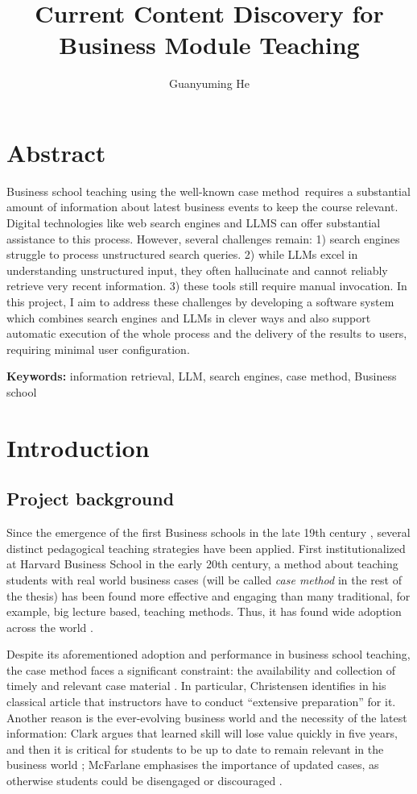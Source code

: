 \documentclass[final-report]{report-template}
\title{Current Content Discovery for Business Module Teaching}
\author{Guanyuming He}
\newcommand\casemethod{case method}
\begin{document}
\maketitlepage  

\section*{Abstract}
Business school teaching using the well-known \casemethod\ requires a
substantial amount of information about latest business events to keep the
course relevant.  Digital technologies like web search engines and LLMS can
offer substantial assistance to this process. However, several challenges
remain: 1) search engines struggle to process unstructured search queries. 2)
while LLMs excel in understanding unstructured input, they often hallucinate
and cannot reliably retrieve very recent information. 3) these tools still
require manual invocation. In this project, I aim to address these challenges
by developing a software system which combines search engines and LLMs in
clever ways and also support automatic execution of the whole process and the
delivery of the results to users, requiring minimal user configuration.

\textbf{Keywords:} information retrieval, LLM, search
engines, \casemethod, Business school

\section{Introduction}
\subsection{Project background} \label{sec.proj.bg}
Since the emergence of the first Business schools in the late 19th century
\cite{first.bis.school.1, first.bis.school.2}, several distinct pedagogical
teaching strategies have been applied.  First institutionalized at Harvard
Business School \cite{case.method.origin.1, case.method.origin.2} in the early
20th century, a method about teaching students with real world business cases
(will be called \emph{\casemethod} in the rest of the thesis) has been found
more effective and engaging \cite{case.method.support.1, case.method.support.2,
case.method.support.3} than many traditional, for example, big lecture based,
teaching methods. Thus, it has found wide adoption across the world
\cite{case.method.adoption.1, case.method.adoption.2}.

Despite its aforementioned adoption and performance in business school
teaching, the case method faces a significant constraint: the availability and
collection of timely and relevant case material \cite{case.method.limit.1,
case.method.limit.3}. In particular, Christensen identifies in his classical
article that instructors have to conduct ``extensive preparation''
\cite{case.method.limit.2} for it. Another reason is the ever-evolving business
world and the necessity of the latest information: Clark argues that learned
skill will lose value quickly in five years, and then it is critical for
students to be up to date to remain relevant in the business world
\cite{case.method.limit.4}; McFarlane emphasises the importance of updated
cases, as otherwise students could be disengaged or discouraged
\cite{case.method.limit.5}.
\end{document}
